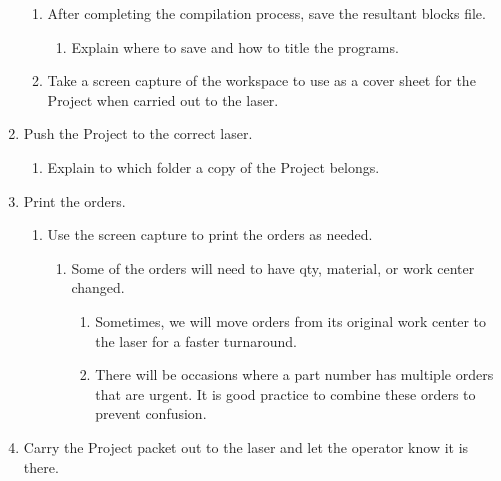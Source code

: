\documentclass[11pt, a4paper, oneside]{report}
\begin{document}
\begin{enumerate}
        \begin{enumerate}
            \item After completing the compilation process, save the resultant blocks file.
                \begin{enumerate}
                    \item Explain where to save and how to title the programs.
                \end{enumerate}
            \item Take a screen capture of the workspace to use as a cover sheet for the Project when carried out to the laser.
        \end{enumerate}
    \item Push the Project to the correct laser.
        \begin{enumerate}
            \item Explain to which folder a copy of the Project belongs.
        \end{enumerate}
    \item Print the orders.
        \begin{enumerate}
            \item Use the screen capture to print the orders as needed.
                \begin{enumerate}
                    \item Some of the orders will need to have qty, material, or work center changed.
                        \begin{enumerate}
                            \item Sometimes, we will move orders from its original work center to the laser for a faster turnaround.
                            \item There will be occasions where a part number has multiple orders that are urgent. It is good practice to combine these orders to prevent confusion.
                        \end{enumerate}
                \end{enumerate}
        \end{enumerate}
    \item Carry the Project packet out to the laser and let the operator know it is there.
\end{enumerate}
\end{document}
